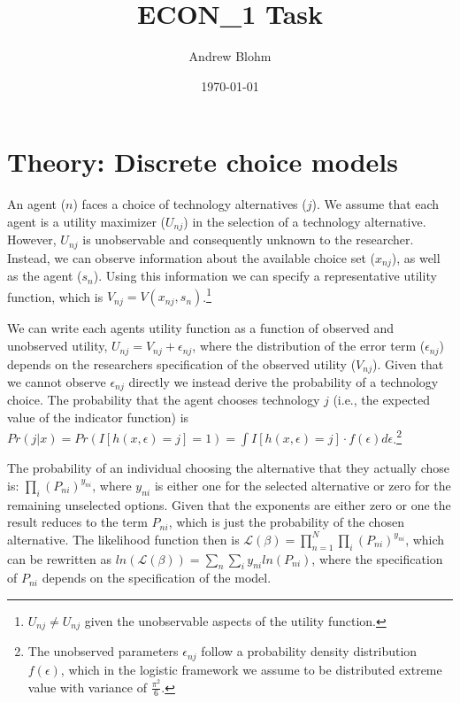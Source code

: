 \documentclass[10pt]{amsart}
\title{ECON\_1 Task}
\author{Andrew Blohm}
\date{\today}
\begin{document}
\maketitle

\section{Theory: Discrete choice models}
An agent ($n$) faces a choice of technology alternatives ($j$).  
We assume that each agent is a utility maximizer ($U_{nj}$) in the selection of a technology alternative.
However, $U_{nj}$ is unobservable and consequently unknown to the researcher.
Instead, we can observe information about the available choice set ($x_{nj}$), as well as the agent ($s_{n}$).
Using this information we can specify a representative utility function, which is $V_{nj} = V(x_{nj}, s_{n})$.\footnote{$U_{nj} \neq U_{nj}$ given the unobservable aspects of the utility function.} 

We can write each agents utility function as a function of observed and unobserved utility, $U_{nj} = V_{nj} + \epsilon_{nj}$, where the distribution of the error term ($\epsilon_{nj}$) depends on the researchers specification of the observed utility ($V_{nj}$). 
Given that we cannot observe $\epsilon_{nj}$ directly we instead derive the probability of a technology choice. 
The probability that the agent chooses technology $j$ (i.e., the expected value of the indicator function) is $Pr(j \vert x) = Pr(I[h(x, \epsilon) = j] = 1) = \int I[h(x, \epsilon) = j]\cdot f(\epsilon) d\epsilon$.\footnote{The unobserved parameters $\epsilon_{nj}$ follow a probability density distribution $f(\epsilon)$, which in the logistic framework we assume to be distributed extreme value with variance of $\frac{\pi^2}{6}$.}

The probability of an individual choosing the alternative that they actually chose is: $\prod_{i} \left(P_{ni}\right)^{y_{ni}}$, where $y_{ni}$ is either one for the selected alternative or zero for the remaining unselected options.
Given that the exponents are either zero or one the result reduces to the term $P_{ni}$, which is just the probability of the chosen alternative. 
The likelihood function then is $\mathcal{L(\beta)} = \prod_{n=1}^N \prod_{i} \left(P_{ni}\right)^{y_{ni}}$, which can be rewritten as $ln(\mathcal{L(\beta)})= \sum_{n} \sum_{i} y_{ni} ln\left(P_{ni}\right)$, where the specification of $P_{ni}$ depends on the specification of the model. 
\end{document}
